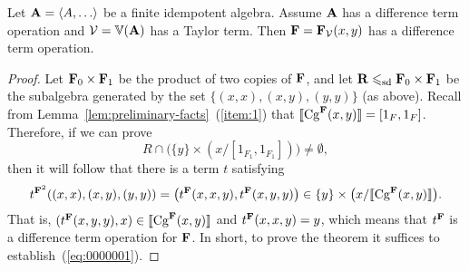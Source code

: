 \begin{theorem}
\label{thm:main-result}
Let $\bA = \<A, \dots\>$ be a finite idempotent algebra.
Assume $\mathbf{A}$ has a difference term operation and 
$\mathcal{V} = \operatorname{\mathbb{V}}(\mathbf{A})$ has a Taylor term.
Then $\mathbf{F} = \mathbf{F}_{\mathcal{V}}(x,y)$ has a difference term operation.
\end{theorem}
\begin{proof}
Let $\mathbf{F}_0 \times \mathbf{F}_1$ be the product of two copies of $\mathbf{F}$,
and let $\mathbf{R} \leqslant_{\mathrm{sd}} \mathbf{F}_0 \times \mathbf{F}_1$ be the subalgebra generated
by the set $\{(x, x), (x, y), (y, y)\}$ (as above).
Recall from Lemma~\ref{lem:preliminary-facts}~(\ref{item:1}) that
$\llbracket \operatorname{Cg}^{\mathbf{F}}(x,y) \rrbracket = [1_{F},1_{F}]$.  Therefore, if we can prove 
\begin{equation}
  \label{eq:0000001}
R \cap \bigl(\{y\} \times (x/[1_{F_1},1_{F_1}])\bigr) \neq \emptyset,
\end{equation}
then it will follow that there is a term $t$ satisfying
\[
t^{\mathbf{F}^2}((x,x),(x,y),(y,y)) =\bigl(t^{\mathbf{F}}(x,x,y), t^{\mathbf{F}}(x,y,y)\bigr) \in
\{y\} \times \bigl(x/\llbracket \operatorname{Cg}^{\mathbf{F}}(x,y) \rrbracket\bigr).
\]
That is,
$(t^{\mathbf{F}}(x,y,y),x) \in \llbracket \operatorname{Cg}^{\mathbf{F}}(x,y) \rrbracket$ and
$t^{\mathbf{F}}(x,x,y) = y$, which means that $t^{\mathbf{F}}$ is a difference term operation 
for $\mathbf{F}$.  In short, to prove the theorem it suffices to establish~(\ref{eq:0000001}). 



\end{proof}
